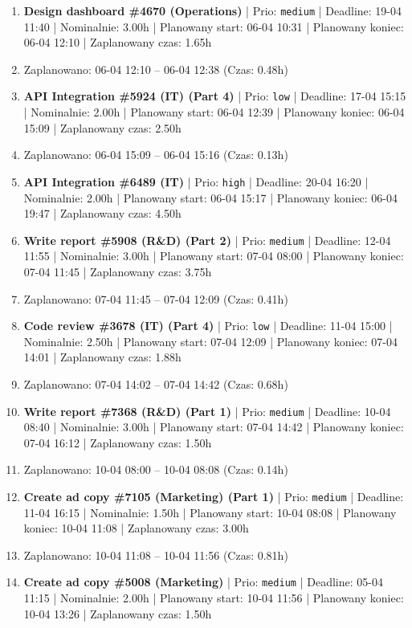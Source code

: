 {\begin{enumerate}
  \item [\textbf{14676}] \textbf{Design dashboard \#4670 (Operations)} | Prio: \texttt{medium} | Deadline: 19-04 11:40 | Nominalnie: 3.00h | Planowany start: 06-04 10:31 | Planowany koniec: 06-04 12:10 | Zaplanowany czas: 1.65h
  \item [\textbf{PRZERWA}] Zaplanowano: 06-04 12:10 -- 06-04 12:38 (Czas: 0.48h)
  \item [\textbf{14696}] \textbf{API Integration \#5924 (IT) (Part 4)} | Prio: \texttt{low} | Deadline: 17-04 15:15 | Nominalnie: 2.00h | Planowany start: 06-04 12:39 | Planowany koniec: 06-04 15:09 | Zaplanowany czas: 2.50h
  \item [\textbf{PRZERWA}] Zaplanowano: 06-04 15:09 -- 06-04 15:16 (Czas: 0.13h)
  \item [\textbf{14620}] \textbf{API Integration \#6489 (IT)} | Prio: \texttt{high} | Deadline: 20-04 16:20 | Nominalnie: 2.00h | Planowany start: 06-04 15:17 | Planowany koniec: 06-04 19:47 | Zaplanowany czas: 4.50h
  \item [\textbf{14674}] \textbf{Write report \#5908 (R\&D) (Part 2)} | Prio: \texttt{medium} | Deadline: 12-04 11:55 | Nominalnie: 3.00h | Planowany start: 07-04 08:00 | Planowany koniec: 07-04 11:45 | Zaplanowany czas: 3.75h
  \item [\textbf{PRZERWA}] Zaplanowano: 07-04 11:45 -- 07-04 12:09 (Czas: 0.41h)
  \item [\textbf{14699}] \textbf{Code review \#3678 (IT) (Part 4)} | Prio: \texttt{low} | Deadline: 11-04 15:00 | Nominalnie: 2.50h | Planowany start: 07-04 12:09 | Planowany koniec: 07-04 14:01 | Zaplanowany czas: 1.88h
  \item [\textbf{PRZERWA}] Zaplanowano: 07-04 14:02 -- 07-04 14:42 (Czas: 0.68h)
  \item [\textbf{14633}] \textbf{Write report \#7368 (R\&D) (Part 1)} | Prio: \texttt{medium} | Deadline: 10-04 08:40 | Nominalnie: 3.00h | Planowany start: 07-04 14:42 | Planowany koniec: 07-04 16:12 | Zaplanowany czas: 1.50h
  \item [\textbf{PRZERWA}] Zaplanowano: 10-04 08:00 -- 10-04 08:08 (Czas: 0.14h)
  \item [\textbf{14650}] \textbf{Create ad copy \#7105 (Marketing) (Part 1)} | Prio: \texttt{medium} | Deadline: 11-04 16:15 | Nominalnie: 1.50h | Planowany start: 10-04 08:08 | Planowany koniec: 10-04 11:08 | Zaplanowany czas: 3.00h
  \item [\textbf{PRZERWA}] Zaplanowano: 10-04 11:08 -- 10-04 11:56 (Czas: 0.81h)
  \item [\textbf{14666}] \textbf{Create ad copy \#5008 (Marketing)} | Prio: \texttt{medium} | Deadline: 05-04 11:15 | Nominalnie: 2.00h | Planowany start: 10-04 11:56 | Planowany koniec: 10-04 13:26 | Zaplanowany czas: 1.50h

\end{enumerate}}
